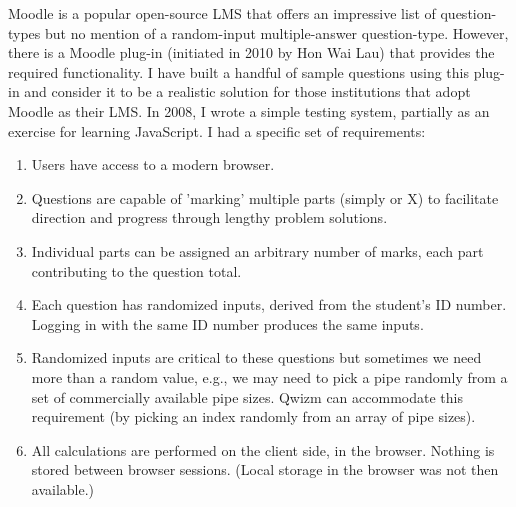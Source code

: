 \documentclass{tufte-handout}
\begin{document}
\parm
Moodle is a popular open-source LMS that offers an impressive list of question-types but no mention of a random-input multiple-answer question-type. However, there is a Moodle plug-in (initiated in 2010 by Hon Wai Lau) that provides the required functionality. I have built a handful of sample questions using this plug-in and consider it to be a realistic solution for those institutions that adopt Moodle as their LMS.
\parb
In 2008, I wrote a simple testing system, partially as an exercise for learning JavaScript. I had a specific set of requirements:
\begin{enumerate}
	\setlength\itemsep{0.125em}
	\item Users have access to a modern browser.
	\item Questions are capable of 'marking' multiple parts (simply \textcolor{Green4}{\Large\checkmark}or \textcolor{Red2}{\textsf{X}}) to facilitate direction and progress through lengthy problem solutions.
	\item Individual parts can be assigned an arbitrary number of marks, each part contributing to the question total.
	\item Each question has randomized inputs, derived from the student's ID number. Logging in with the same ID number produces the same inputs.
	\item Randomized inputs are critical to these questions but sometimes we need more than a random value, e.g., we may need to pick a pipe randomly from a set of commercially available pipe sizes. Qwizm can accommodate this requirement (by picking an index randomly from an array of pipe sizes).
	\item All calculations are performed on the client side, in the browser. Nothing is stored between browser sessions. (Local storage in the browser was not then available.)
	\suspend
\end{enumerate}
\newpage
\end{document}
